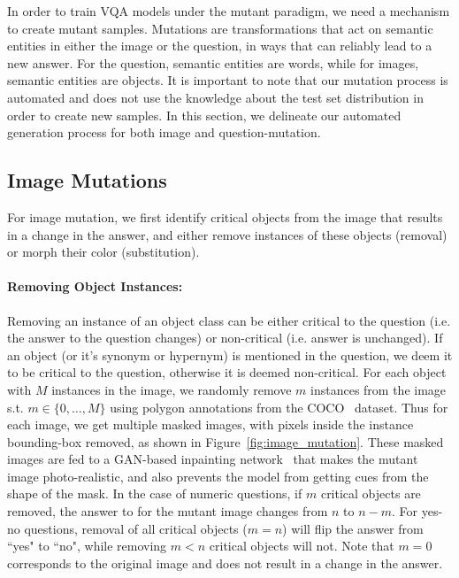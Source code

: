     


In order to train VQA models under the mutant paradigm, we need a mechanism to create mutant samples.
Mutations are transformations that act on semantic entities in either the image or the question, in ways that can reliably lead to a new answer.
For the question, semantic entities are words, while for images, semantic entities are objects.
It is important to note that our mutation process is automated and does not use the knowledge about the test set distribution in order to create new samples.
In this section, we delineate our automated generation process for both image and question-mutation.


    \subsection{Image Mutations}
    For image mutation, we first identify critical objects from the image that results in a change in the answer, and either remove instances of these objects (removal) or morph their color (substitution).
        
        \paragraph{Removing Object Instances:}
        Removing an instance of an object class can be either critical to the question (i.e. the answer to the question changes) or non-critical (i.e. answer is unchanged).
        If an object (or it's synonym or hypernym) is mentioned in the question, we deem it to be critical to the question, otherwise it is deemed non-critical.
        For each object with $M$ instances in the image, we randomly remove $m$ instances from the image s.t. $m \in \{0, \dots, M\}$ using polygon annotations from the COCO~\citep{lin2014microsoft} dataset.
        Thus for each image, we get multiple masked images, with pixels inside the instance bounding-box removed, as shown in Figure~\ref{fig:image_mutation}.
        These masked images are fed to a GAN-based inpainting network~\citep{yu2018generative} that makes the mutant image photo-realistic, and also prevents the model from getting cues from the shape of the mask. 
        In the case of numeric questions, if $m$ critical objects are removed, the answer to for the mutant image changes from $n$ to $n-m$.
        For yes-no questions, removal of all critical objects ($m=n$) will flip the answer from ``yes" to ``no", while removing $m<n$ critical objects will not.
        Note that $m=0$ corresponds to the original image and does not result in a change in the answer.
        
